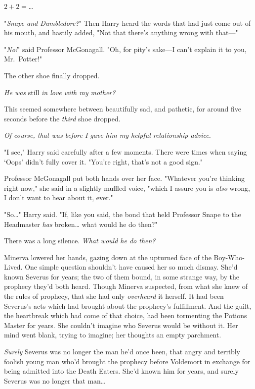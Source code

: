 $2 + 2 = ${\ldots}

"\emph{Snape and Dumbledore?}" Then Harry heard the words that had just come 
out of his mouth, and hastily added, "Not that there's anything wrong with 
that---"

"\emph{No!}" said Professor McGonagall. "Oh, for pity's sake---I can't explain 
it to you, Mr.~Potter!"

The other shoe finally dropped.

\emph{He was} still \emph{in love with my mother?}

This seemed somewhere between beautifully sad, and pathetic, for around five 
seconds before the \emph{third} shoe dropped.

\emph{Of course, that was before I gave him my helpful relationship advice.}

"I see," Harry said carefully after a few moments. There were times when saying 
`Oops' didn't fully cover it. "You're right, that's not a good sign."

Professor McGonagall put both hands over her face. "Whatever you're thinking 
right now," she said in a slightly muffled voice, "which I assure you is 
\emph{also} wrong, I don't want to hear about it, ever."

"So{\ldots}" Harry said. "If, like you said, the bond that held Professor Snape 
to the Headmaster \emph{has} broken{\ldots} what would he do then?"

There was a long silence.
\sbreak
\emph{What would he do then?}

Minerva lowered her hands, gazing down at the upturned face of the 
Boy-Who-Lived. One simple question shouldn't have caused her so much dismay. 
She'd known Severus for years; the two of them bound, in some strange way, by 
the prophecy they'd both heard. Though Minerva suspected, from what she knew of 
the rules of prophecy, that she had only \emph{overheard} it herself. It had 
been Severus's acts which had brought about the prophecy's fulfillment. And the 
guilt, the heartbreak which had come of that choice, had been tormenting the 
Potions Master for years. She couldn't imagine who Severus would be without it. 
Her mind went blank, trying to imagine; her thoughts an empty parchment.

\emph{Surely} Severus was no longer the man he'd once been, that angry and 
terribly foolish young man who'd brought the prophecy before Voldemort in 
exchange for being admitted into the Death Eaters. She'd known him for years, 
and surely Severus was no longer that man{\ldots}

